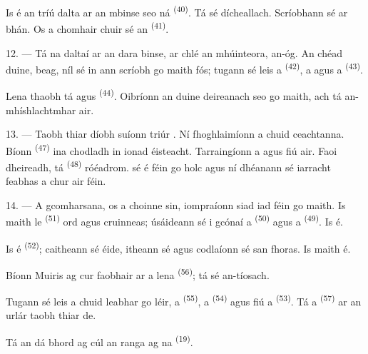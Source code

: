 Is é an tríú dalta ar an mbinse seo ná  \textsuperscript{(40)}. Tá
sé dícheallach. Scríobhann sé ar  bhán. Os a chomhair chuir
sé an  \textsuperscript{(41)}.

12. --- Tá na daltaí ar an dara binse, ar chlé an mhúinteora, an-óg. An chéad
duine,  beag, níl sé in ann scríobh go maith fós; tugann sé leis a
 \textsuperscript{(42)}, a  agus a
 \textsuperscript{(43)}.

Lena thaobh tá  agus 
\textsuperscript{(44)}. Oibríonn an duine deireanach seo go maith, ach tá
 an-mhíshlachtmhar air.

13. --- Taobh thiar díobh suíonn triúr . Ní fhoghlaimíonn
 a chuid ceachtanna. Bíonn  \textsuperscript{(47)} ina
chodladh in ionad éisteacht. Tarraingíonn a 
 agus  fiú air. Faoi dheireadh, tá
 \textsuperscript{(48)} róéadrom.  sé é féin go
holc agus ní dhéanann sé iarracht feabhas a chur air féin.

14. --- A gcomharsana, os a choinne sin, iompraíonn siad iad féin go maith. Is
maith le  \textsuperscript{(51)} ord agus cruinneas; úsáideann sé
i gcónaí a  \textsuperscript{(50)} agus a 
\textsuperscript{(49)}. Is  é.

Is  é  \textsuperscript{(52)}; caitheann sé
éide, itheann sé agus codlaíonn sé san fhoras. Is  maith é.

Bíonn Muiris ag cur faobhair ar a  lena  \textsuperscript{(56)}; tá sé an-tíosach.

Tugann sé leis a chuid leabhar go léir, a 
\textsuperscript{(55)}, a  \textsuperscript{(54)} agus fiú a
 \textsuperscript{(53)}. Tá a 
\textsuperscript{(57)} ar an urlár taobh thiar de.

Tá an dá bhord ag cúl an ranga ag na 
\textsuperscript{(19)}.

\VUsaut{4.6mm}
\VUsaut{3.4mm}

